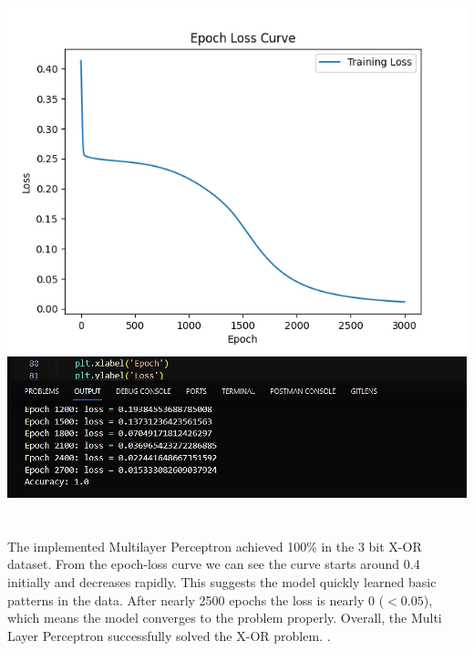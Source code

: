 \documentclass{article}
\begin{document}
    \vspace{1cm}
    \section{}
    \vspace{0.5cm}
    \includegraphics[width=15cm, height=10cm]{Figure_1.png}\\
    \includegraphics[width=15cm]{publication_ready_SS(142)_1.jpg}

    \section{}

    \noindent The implemented Multilayer Perceptron achieved 100\% in the 3 bit X-OR dataset. From the epoch-loss curve we can see the curve starts around 0.4 initially and decreases rapidly. This suggests the model quickly learned basic patterns in the data. After nearly 2500 epochs the loss is nearly 0 ($<0.05$), which means the model converges to the problem properly. Overall, the Multi Layer Perceptron successfully solved the X-OR problem. . 
\end{document}
